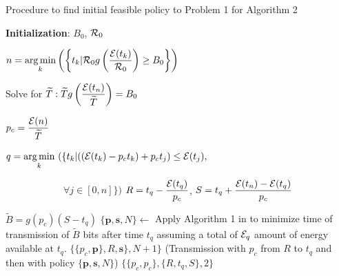 
\begin{algorithm}
\caption{Procedure to find initial feasible policy to Problem 1 for Algorithm 2}

\footnotesize%
\label{init_policy}
\begin{algorithmic}[1]
\State \textbf{Initialization}: $B_0$, $\mathcal{R}_0$

\State $n=\displaystyle \operatorname*{arg\,min}_k\left(\left\{t_k | \mathcal{R}_0 g\left(\frac{\mathcal{E}(t_k)}{\mathcal{R}_0}\right)\geq B_0\right\}\right)$ \label{init_policy_Etn}

\State Solve for $\widetilde{T}: \widetilde{T}g\left(\dfrac{\mathcal{E}(t_n)}{\widetilde{T}}\right) = B_0$\label{init_policy_CP_time}

\State $p_c=\dfrac{\mathcal{E}(n)}{\widetilde{T}}$

\State $q=\displaystyle \operatorname*{arg\,min}_k\ ( \{ t_k | ((\mathcal{E}(t_k) - p_ct_k) + p_ct_j) \leq \mathcal{E}(t_j),$

$			 						\qquad \qquad \qquad \forall j\in[0,n]  \} )$
\label{init_policy_t_q}
\State $R=t_q-\dfrac{\mathcal{E}(t_q)}{p_c}$, $S=t_q+\dfrac{\mathcal{E}(t_n)-\mathcal{E}(t_q)}{p_c}$

	\State $\widetilde{B}=g(p_c)(S-t_q)$\label{init_policy_bits_t_q}  
	\State $\{\textbf{p},\textbf{s},N\}\gets$  Apply Algorithm 1 in \cite{Yang} to 	minimize time of
		\Statex   transmission of $\widetilde{B}$ bits  after time $t_q$ assuming	a  total of $\mathcal{E}_{q}$   
		\Statex amount of energy available at $t_q$. 
	\State\Return $\{\{p_c,\textbf{p}\},R,\textbf{s}\},N+1\}$ \label{init_policy_Yang}
	 	\Statex (Transmission with $p_c$ from $R$ to $t_q$ and then with
	 	\Statex policy $\{\textbf{p},\textbf{s},N\}$)
\Else 
	\State\Return $\{\{p_c,p_c\},\{R,t_q,S\},2\}$ \label{init_policy_CP}
\EndIf
\EndProcedure
\end{algorithmic}
\end{algorithm}

